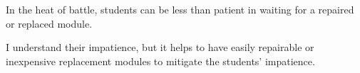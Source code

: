 In the heat of battle, students can be less than patient in waiting for a repaired or replaced module.
\bigskip

I understand their impatience, but it helps to have easily repairable or inexpensive replacement modules to mitigate the students' impatience.
\bigskip